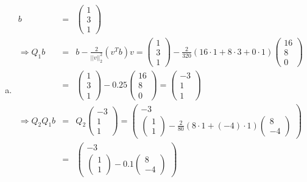 \documentclass[11pt]{article} %
\begin{document}
\begin{enumerate}[a)]
\item
\begin{eqnarray*}
b &=& \begin{pmatrix} 1 \\ 3 \\ 1 \end{pmatrix} \\
\Rightarrow Q_1b &=& b - \frac 2 {||v||_2^2}(v^Tb)v = \begin{pmatrix} 1 \\ 3 \\ 1 \end{pmatrix} - \frac 2 {320}(16\cdot 1 +8 \cdot 3 + 0\cdot 1)\begin{pmatrix}16 \\ 8 \\ 0 \end{pmatrix} \\
&=&  \begin{pmatrix} 1 \\ 3 \\ 1 \end{pmatrix} - 0.25\begin{pmatrix}16 \\ 8 \\ 0 \end{pmatrix} = \begin{pmatrix} -3 \\ 1 \\ 1 \end{pmatrix} \\
\Rightarrow Q_2Q_1b &=& Q_2  \begin{pmatrix} -3 \\ 1 \\ 1 \end{pmatrix} = \begin{pmatrix} -3 \\\hline
\begin{pmatrix}1 \\ 1 \end{pmatrix} - \frac 2 {80} (8\cdot 1 + (-4)\cdot 1)\begin{pmatrix}8 \\ -4\end{pmatrix}
\end{pmatrix} \\
&=& \begin{pmatrix} -3 \\\hline
\begin{pmatrix}1 \\ 1 \end{pmatrix} -0.1\begin{pmatrix}8 \\ -4\end{pmatrix}

\end{pmatrix}
\end{eqnarray*}
\end{enumerate}
\end{document}
